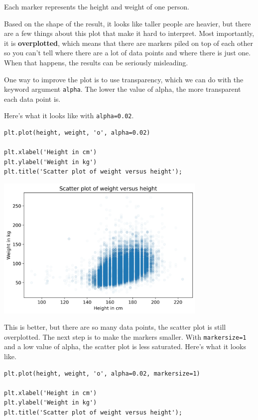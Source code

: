 Each marker represents the height and weight of one person.

Based on the shape of the result, it looks like taller people are
heavier, but there are a few things about this plot that make it hard to
interpret. Most importantly, it is \textbf{overplotted}, which means
that there are markers piled on top of each other so you can't tell
where there are a lot of data points and where there is just one. When
that happens, the results can be seriously misleading.

One way to improve the plot is to use transparency, which we can do with
the keyword argument \passthrough{\lstinline!alpha!}. The lower the
value of alpha, the more transparent each data point is.

Here's what it looks like with \passthrough{\lstinline!alpha=0.02!}.

\begin{lstlisting}[]
plt.plot(height, weight, 'o', alpha=0.02)

plt.xlabel('Height in cm')
plt.ylabel('Weight in kg')
plt.title('Scatter plot of weight versus height');
\end{lstlisting}

\begin{center}
\includegraphics[width=4in]{chapters/09_relationships_files/09_relationships_14_0.png}
\end{center}

This is better, but there are so many data points, the scatter plot is
still overplotted. The next step is to make the markers smaller. With
\passthrough{\lstinline!markersize=1!} and a low value of alpha, the
scatter plot is less saturated. Here's what it looks like.

\begin{lstlisting}[]
plt.plot(height, weight, 'o', alpha=0.02, markersize=1)

plt.xlabel('Height in cm')
plt.ylabel('Weight in kg')
plt.title('Scatter plot of weight versus height');
\end{lstlisting}

